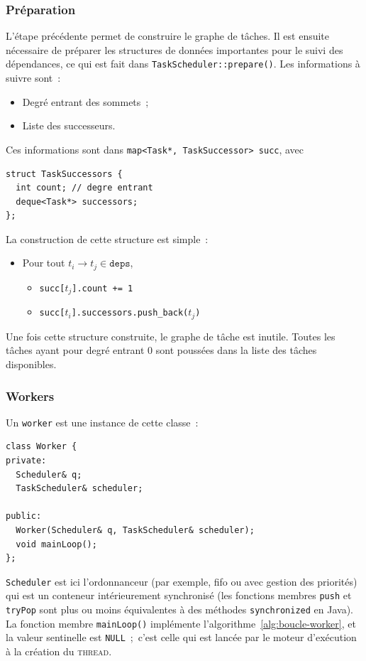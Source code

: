 \documentclass[11pt]{article}
\theoremstyle{plain} %
\theoremstyle{definition} %
\begin{document}
\subsubsection{Préparation}
\label{sec:preparation}
L'étape précédente permet de construire le graphe de tâches.
Il est ensuite nécessaire de préparer les structures de données importantes pour le suivi des dépendances, ce qui est fait dans \texttt{TaskScheduler::prepare()}.
Les informations à suivre sont~:
\begin{itemize}
\item Degré entrant des sommets~;
\item Liste des successeurs.
\end{itemize}
Ces informations sont dans \texttt{map<Task*, TaskSuccessor> succ}, avec
\begin{lstlisting}
struct TaskSuccessors {
  int count; // degre entrant
  deque<Task*> successors;
};
\end{lstlisting}

La construction de cette structure est simple~:~
\begin{itemize}
\item Pour tout $t_i \to t_j \in \mathtt{deps}$,
  \begin{itemize}
  \item \texttt{succ[$t_j$].count += 1}
  \item \texttt{succ[$t_i$].successors.push\_back($t_j$)}
  \end{itemize}
\end{itemize}

Une fois cette structure construite, le graphe de tâche est inutile.
Toutes les tâches ayant pour degré entrant $0$ sont poussées dans la liste des tâches disponibles.

\subsubsection{Workers}
\label{sec:workers}
Un \texttt{worker} est une instance de cette classe~:
\begin{lstlisting}
class Worker {
private:
  Scheduler& q;
  TaskScheduler& scheduler;

public:
  Worker(Scheduler& q, TaskScheduler& scheduler);
  void mainLoop();
};
\end{lstlisting}
\texttt{Scheduler} est ici l'ordonnanceur (par exemple, \ac{fifo} ou avec gestion des priorités) qui est un conteneur intérieurement synchronisé (les fonctions membres \texttt{push} et \texttt{tryPop} sont plus ou moins équivalentes à des méthodes \texttt{synchronized} en Java).
La fonction membre \texttt{mainLoop()} implémente l'algorithme~\ref{alg:boucle-worker}, et la valeur sentinelle est \texttt{NULL}~;~c'est celle qui est lancée par le moteur d'exécution à la création du \textsc{thread}.
\end{document}
